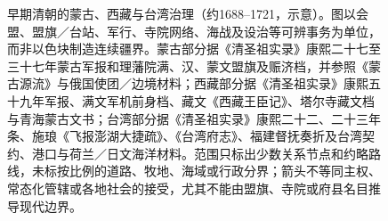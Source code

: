 \begin{figure}[htbp]
  \caption{早期清朝的蒙古、西藏与台湾治理（约1688--1721，示意）。图以会盟、盟旗／台站、军行、寺院网络、海战及设治等可辨事务为单位，而非以色块制造连续疆界。蒙古部分据《清圣祖实录》康熙二十七至三十七年蒙古军报和理藩院满、汉、蒙文盟旗及赈济档，并参照《蒙古源流》与俄国使团／边境材料；西藏部分据《清圣祖实录》康熙五十九年军报、满文军机前身档、藏文《西藏王臣记》、塔尔寺藏文档与青海蒙古文书；台湾部分据《清圣祖实录》康熙二十二、二十三年条、施琅《飞报澎湖大捷疏》、《台湾府志》、福建督抚奏折及台湾契约、港口与荷兰／日文海洋材料。范围只标出少数关系节点和约略路线，未标按比例的道路、牧地、海域或行政分界；箭头不等同主权、常态化管辖或各地社会的接受，尤其不能由盟旗、寺院或府县名目推导现代边界。}
  \label{fig:early-qing-frontier-governance}
\end{figure}
